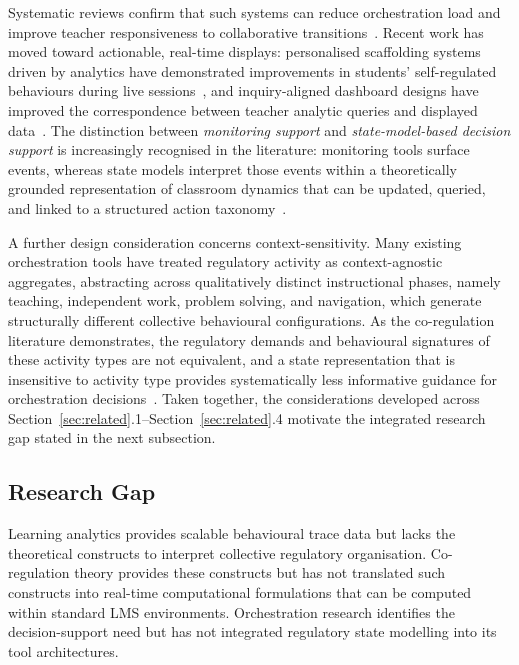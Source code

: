 \documentclass[preprint,12pt,authoryear]{elsarticle}
\begin{document}
Systematic reviews confirm that such systems can reduce orchestration load and improve teacher responsiveness to collaborative transitions~\citep{feng2023}. Recent work has moved toward actionable, real-time displays: personalised scaffolding systems driven by analytics have demonstrated improvements in students' self-regulated behaviours during live sessions~\citep{lim2023}, and inquiry-aligned dashboard designs have improved the correspondence between teacher analytic queries and displayed data~\citep{pozdniakov2022}. The distinction between \textit{monitoring support} and \textit{state-model-based decision support} is increasingly recognised in the literature: monitoring tools surface events, whereas state models interpret those events within a theoretically grounded representation of classroom dynamics that can be updated, queried, and linked to a structured action taxonomy~\citep{martinezmaldonado2019, amarasinghe2020}.

A further design consideration concerns context-sensitivity. Many existing orchestration tools have treated regulatory activity as context-agnostic aggregates, abstracting across qualitatively distinct instructional phases, namely teaching, independent work, problem solving, and navigation, which generate structurally different collective behavioural configurations. As the co-regulation literature demonstrates, the regulatory demands and behavioural signatures of these activity types are not equivalent, and a state representation that is insensitive to activity type provides systematically less informative guidance for orchestration decisions~\citep{hadwin2018, jarvela2023b, lockyer2013}. Taken together, the considerations developed across Section~\ref{sec:related}.1--Section~\ref{sec:related}.4 motivate the integrated research gap stated in the next subsection.

\subsection{Research Gap}

Learning analytics provides scalable behavioural trace data but lacks the theoretical constructs to interpret collective regulatory organisation. Co-regulation theory provides these constructs but has not translated such constructs into real-time computational formulations that can be computed within standard LMS environments. Orchestration research identifies the decision-support need but has not integrated regulatory state modelling into its tool architectures.
\end{document}
